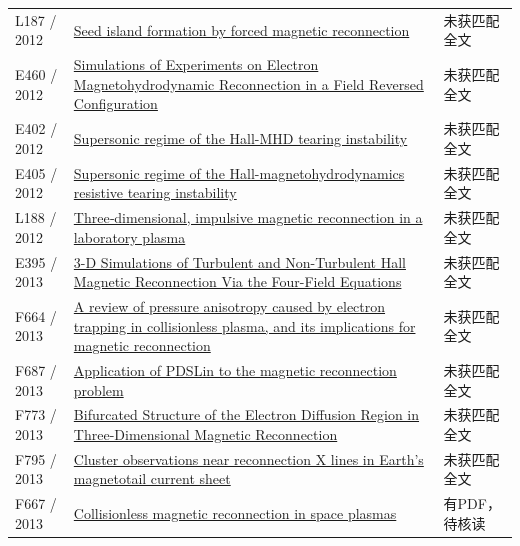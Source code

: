 \documentclass[UTF8,a4paper,11pt,openany,fontset=fandol]{ctexbook}
\begin{document}
\begin{longtable}{P{24mm}P{97mm}P{27mm}}
L187 / 2012 & \href{https://doi.org/10.1088/0029-5515/52/6/063020}{Seed island formation by forced magnetic reconnection} & 未获匹配全文\\

E460 / 2012 & \href{http://absimage.aps.org/image/TSF12/MWS_TSF12-2012-000189.pdf}{Simulations of Experiments on Electron Magnetohydrodynamic Reconnection in a Field Reversed Configuration} & 未获匹配全文\\

E402 / 2012 & \href{http://absimage.aps.org/image/APR12/MWS_APR12-2012-000859.pdf}{Supersonic regime of the Hall-MHD tearing instability} & 未获匹配全文\\

E405 / 2012 & \href{https://doi.org/10.1063/1.4739787}{Supersonic regime of the Hall-magnetohydrodynamics resistive tearing instability} & 未获匹配全文\\

L188 / 2012 & \href{https://doi.org/10.1029/2012gl054574}{Three‐dimensional,  impulsive magnetic reconnection in a laboratory plasma} & 未获匹配全文\\

E395 / 2013 & \href{https://ui.adsabs.harvard.edu/abs/2013shin.confE..78D/abstract}{3-D Simulations of Turbulent and Non-Turbulent Hall Magnetic Reconnection Via the Four-Field Equations} & 未获匹配全文\\

F664 / 2013 & \href{https://doi.org/10.1063/1.4811092}{A review of pressure anisotropy caused by electron trapping in collisionless plasma,  and its implications for magnetic reconnection} & 未获匹配全文\\

F687 / 2013 & \href{https://doi.org/10.1088/1749-4699/6/1/014002}{Application of PDSLin to the magnetic reconnection problem} & 未获匹配全文\\

F773 / 2013 & \href{https://doi.org/10.1103/physrevlett.110.265004}{Bifurcated Structure of the Electron Diffusion Region in Three-Dimensional Magnetic Reconnection} & 未获匹配全文\\

F795 / 2013 & \href{https://doi.org/10.1002/jgra.50403}{Cluster observations near reconnection X lines in Earth's magnetotail current sheet} & 未获匹配全文\\

F667 / 2013 & \href{https://doi.org/10.3389/fphy.2013.00031}{Collisionless magnetic reconnection in space plasmas} & 有PDF，待核读\\


\end{longtable}
\end{document}
